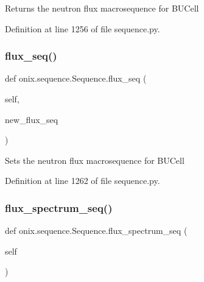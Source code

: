 \begin{DoxyVerb}Returns the neutron flux macrosequence for BUCell
\end{DoxyVerb}
 

Definition at line 1256 of file sequence.\+py.

\mbox{\label{classonix_1_1sequence_1_1Sequence_aad160c741c397ef1dfe8ed927e8f199f}} 
\subsubsection{\texorpdfstring{flux\+\_\+seq()}{flux\_seq()}\hspace{0.1cm}{\footnotesize\ttfamily [2/2]}}
{\footnotesize\ttfamily def onix.\+sequence.\+Sequence.\+flux\+\_\+seq (\begin{DoxyParamCaption}\item[{}]{self,  }\item[{}]{new\+\_\+flux\+\_\+seq }\end{DoxyParamCaption})}

\begin{DoxyVerb}Sets the neutron flux macrosequence for BUCell
\end{DoxyVerb}
 

Definition at line 1262 of file sequence.\+py.

\mbox{\label{classonix_1_1sequence_1_1Sequence_a36aa488bccd1ef500741808076fff801}} 
\subsubsection{\texorpdfstring{flux\+\_\+spectrum\+\_\+seq()}{flux\_spectrum\_seq()}\hspace{0.1cm}{\footnotesize\ttfamily [1/2]}}
{\footnotesize\ttfamily def onix.\+sequence.\+Sequence.\+flux\+\_\+spectrum\+\_\+seq (\begin{DoxyParamCaption}\item[{}]{self }\end{DoxyParamCaption})}


